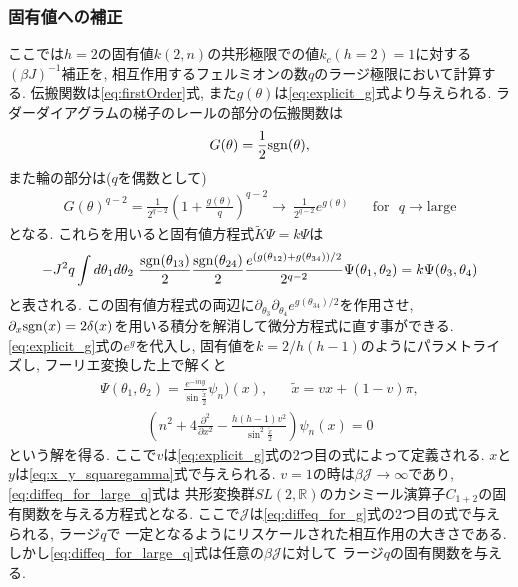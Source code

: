 \subsubsection{固有値への補正}
ここでは$h=2$の固有値$k(2, n)$の共形極限での値$k_c(h=2)=1$に対する$(\beta J)^{-1}$補正を, 
相互作用するフェルミオンの数$q$のラージ極限において計算する. 
伝搬関数は\eqref{eq:firstOrder}式, また$g(\theta)$は\eqref{eq:explicit_g}式より与えられる. 
ラダーダイアグラムの梯子のレールの部分の伝搬関数は
\begin{align}
	G(\theta) = \frac{1}{2}\mathrm{sgn}(\theta),
\end{align}
また輪の部分は($q$を偶数として)
\begin{align}
	G(\theta)^{q-2}
	= \frac{1}{2^{q-2}}\left(1 + \frac{g(\theta)}{q}\right)^{q-2}
	\to\ \frac{1}{2^{q-2}}e^{g(\theta)}
	\hspace{20pt}\mathrm{for}\ \ \ q \to \mathrm{large}
\end{align}
となる. 
これらを用いると固有値方程式$\tilde{K}\Psi = k\Psi$は
\begin{align}
	-J^2q\int d\theta_1 d\theta_2\ 
		\frac{\sgn(\theta_{13})}{2}\frac{\sgn(\theta_{24})}{2}
		\frac{e^{(g(\theta_{12}) + g(\theta_{34}))/2}}{2^{q-2}}
		\Psi(\theta_1, \theta_2)
	= k\Psi(\theta_3, \theta_4)
\end{align}
と表される. 
この固有値方程式の両辺に$\partial_{\theta_3}\partial_{\theta_4}e^{g(\theta_{34})/2}$を作用させ, 
$\partial_x\mathrm{sgn}(x) = 2\delta(x)$を用いる積分を解消して微分方程式に直す事ができる. 
\eqref{eq:explicit_g}式の$e^g$を代入し, 固有値を$k = 2/h(h-1)$のようにパラメトライズし, 
フーリエ変換した上で解くと
\begin{align}
	\Psi(\theta_1, \theta_2) = \frac{e^{-iny}}{\sin\frac{\tilde{x}}{2}}\psi_n)(x),
	\hspace{20pt}\tilde{x} = vx + (1-v)\pi,
	\label{eq:eigenfunc_of_tilde_K}
\end{align}
\begin{align}
	\left(
		n^2 + 4\frac{\partial^2}{\partial x^2} - 
		\frac{h(h-1)v^2}{\sin^2\frac{\tilde{x}}{2}}
	\right)\psi_n(x) = 0
	\label{eq:diffeq_for_large_q}
\end{align}
という解を得る. ここで$v$は\eqref{eq:explicit_g}式の2つ目の式によって定義される. 
$x$と$y$は\eqref{eq:x_y_squaregamma}式で与えられる. 
$v=1$の時は$\beta \mathcal{J} \to \infty$であり, \eqref{eq:diffeq_for_large_q}式は
共形変換群$SL(2,\mathbb{R})$のカシミール演算子$C_{1+2}$の固有関数を与える方程式となる. 
ここで$\mathcal{J}$は\eqref{eq:diffeq_for_g}式の2つ目の式で与えられる, ラージ$q$で
一定となるようにリスケールされた相互作用の大きさである. 
しかし\eqref{eq:diffeq_for_large_q}式は任意の$\beta \mathcal{J}$に対して
ラージ$q$の固有関数を与える. 

